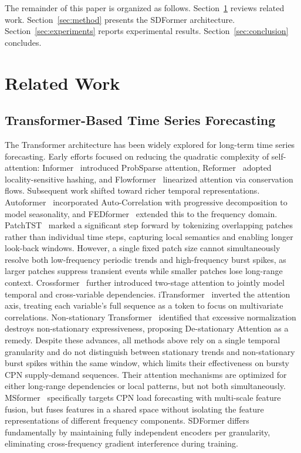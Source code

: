 \documentclass[journal]{IEEEtran}
\begin{document}
The remainder of this paper is organized as follows.
Section~\ref{sec:related} reviews related work.
Section~\ref{sec:method} presents the SDFormer architecture.
Section~\ref{sec:experiments} reports experimental results.
Section~\ref{sec:conclusion} concludes.

\section{Related Work}
\label{sec:related}

\subsection{Transformer-Based Time Series Forecasting}

The Transformer architecture has been widely explored for long-term time
series forecasting.
Early efforts focused on reducing the quadratic complexity of self-attention:
Informer~\cite{informer} introduced ProbSparse attention, Reformer~\cite{reformer}
adopted locality-sensitive hashing, and Flowformer~\cite{flowformer} linearized
attention via conservation flows.
Subsequent work shifted toward richer temporal representations.
Autoformer~\cite{autoformer} incorporated Auto-Correlation with progressive
decomposition to model seasonality, and FEDformer~\cite{fedformer} extended
this to the frequency domain.
PatchTST~\cite{patchtst} marked a significant step forward by tokenizing
overlapping patches rather than individual time steps, capturing local
semantics and enabling longer look-back windows.
However, a single fixed patch size cannot simultaneously resolve both
low-frequency periodic trends and high-frequency burst spikes, as larger
patches suppress transient events while smaller patches lose long-range
context.
Crossformer~\cite{crossformer} further introduced two-stage attention to
jointly model temporal and cross-variable dependencies.
iTransformer~\cite{itransformer} inverted the attention axis, treating each
variable's full sequence as a token to focus on multivariate correlations.
Non-stationary Transformer~\cite{nonstationary} identified that excessive
normalization destroys non-stationary expressiveness, proposing De-stationary
Attention as a remedy.
Despite these advances, all methods above rely on a single temporal
granularity and do not distinguish between stationary trends and
non-stationary burst spikes within the same window, which limits their
effectiveness on bursty CPN supply-demand sequences.
Their attention mechanisms are optimized for either long-range dependencies
or local patterns, but not both simultaneously.
MSformer~\cite{msformer} specifically targets CPN load forecasting with
multi-scale feature fusion, but fuses features in a shared space without
isolating the feature representations of different frequency components.
SDFormer differs fundamentally by maintaining fully independent encoders
per granularity, eliminating cross-frequency gradient interference during
training.
\end{document}
